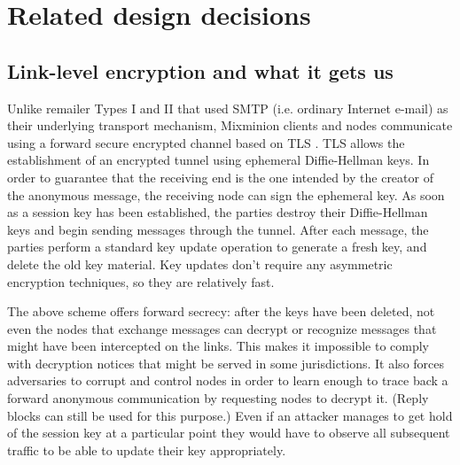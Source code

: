 \documentclass{llncs}
\begin{document}
\section{Related design decisions}

\subsection{Link-level encryption and what it gets us}
\label{subsec:link-encrypt}

Unlike remailer Types I and II that used SMTP \cite{SMTP} (i.e. ordinary
Internet e-mail) as their underlying transport mechanism, Mixminion
clients and nodes communicate using a forward secure encrypted channel
based on TLS \cite{TLS}.
TLS allows the establishment of an encrypted tunnel using ephemeral
Diffie-Hellman keys. In order to guarantee that the receiving end is
the one intended by the creator of the anonymous message, the
receiving node can sign the ephemeral key. As soon as a session key
has been established, the parties destroy their Diffie-Hellman keys
and begin sending messages through the tunnel. After each message, the
parties perform a standard key update operation to generate a fresh
key, and delete the old key material.  Key updates don't require any
asymmetric encryption techniques, so they are relatively fast.

%


%

The above scheme offers forward secrecy: after the keys
have been deleted, not even the
nodes that exchange messages can decrypt or recognize messages
that might have been intercepted on the links. This makes it
impossible to comply with decryption notices that might be served in
some jurisdictions.  
It also forces adversaries to 
corrupt and control nodes in order to learn enough to trace
back a forward anonymous communication by requesting nodes to decrypt
it. 
(Reply blocks can still be used for this purpose.)  Even if an
attacker manages to get hold of the session key at a particular point
they would have to observe all subsequent traffic to be able to update
their key appropriately.
\end{document}
